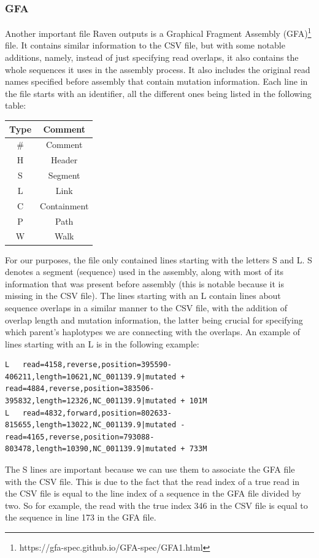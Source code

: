 \documentclass[times, utf8, diplomski, english]{fer_eng}
\begin{document}
\subsubsection{GFA}
\label{subsubsec:gfa}

Another important file Raven outputs is a Graphical Fragment Assembly (GFA)\footnote{https://gfa-spec.github.io/GFA-spec/GFA1.html} file. It contains similar information to the CSV file, but with some notable additions, namely, instead of just specifying read overlaps, it also contains the whole sequences it uses in the assembly process. It also includes the original read names specified before assembly that contain mutation information. Each line in the file starts with an identifier, all the different ones being listed in the following table:
\begin{center}
	\begin{tabular}{ |c|c| }
		\hline
		\textbf{Type} & \textbf{Comment} \\
		\hline
		\# & Comment \\
		\hline
		H & Header \\
		\hline
		S & Segment \\
		\hline
		L & Link \\
		\hline
		C & Containment \\
		\hline
		P & Path \\
		\hline
		W & Walk \\
		\hline
	\end{tabular}
\end{center}
For our purposes, the file only contained lines starting with the letters S and L. S denotes a segment (sequence) used in the assembly, along with most of its information that was present before assembly (this is notable because it is missing in the CSV file). The lines starting with an L contain lines about sequence overlaps in a similar manner to the CSV file, with the addition of overlap length and mutation information, the latter being crucial for specifying which parent's haplotypes we are connecting with the overlaps. An example of lines starting with an L is in the following example:
\begin{lstlisting}
L	read=4158,reverse,position=395590-406211,length=10621,NC_001139.9|mutated +	read=4884,reverse,position=383506-395832,length=12326,NC_001139.9|mutated + 101M
L	read=4832,forward,position=802633-815655,length=13022,NC_001139.9|mutated -	read=4165,reverse,position=793088-803478,length=10390,NC_001139.9|mutated + 733M
\end{lstlisting}
The S lines are important because we can use them to associate the GFA file with the CSV file. This is due to the fact that the read index of a true read in the CSV file is equal to the line index of a sequence in the GFA file divided by two. So for example, the read with the true index 346 in the CSV file is equal to the sequence in line 173 in the GFA file.
\end{document}
